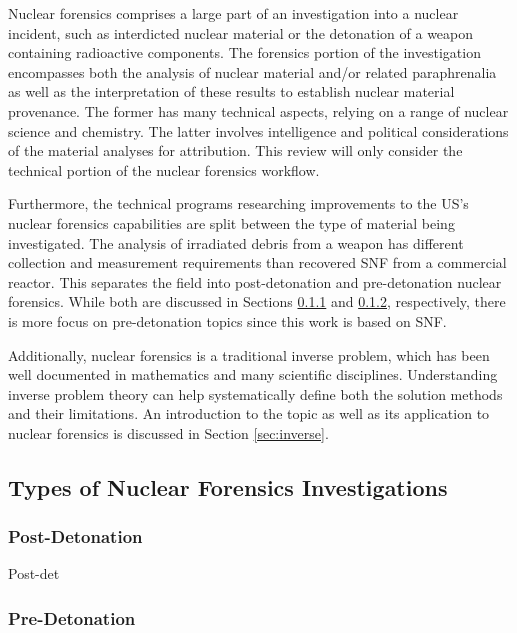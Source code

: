 Nuclear forensics comprises a large part of an investigation into a nuclear
incident, such as interdicted nuclear material or the detonation of a weapon
containing radioactive components.  The forensics portion of the investigation
encompasses both the analysis of nuclear material and/or related paraphrenalia
as well as the interpretation of these results to establish nuclear material
provenance. The former has many technical aspects, relying on a range of
nuclear science and chemistry.  The latter involves intelligence and political
considerations of the material analyses for attribution. This review will only
consider the technical portion of the nuclear forensics workflow.

Furthermore, the technical programs researching improvements to the \gls{US}'s
nuclear forensics capabilities are split between the type of material being
investigated. The analysis of irradiated debris from a weapon has different
collection and measurement requirements than recovered \gls{SNF} from a
commercial reactor. This separates the field into post-detonation and
pre-detonation nuclear forensics. While both are discussed in Sections
\ref{sec:postdet} and \ref{sec:predet}, respectively, there is more focus on
pre-detonation topics since this work is based on \gls{SNF}.

Additionally, nuclear forensics is a traditional inverse problem, which has
been well documented in mathematics and many scientific disciplines.
Understanding inverse problem theory can help systematically define both the
solution methods and their limitations. An introduction to the topic as well as
its application to nuclear forensics is discussed in Section \ref{sec:inverse}.

\subsection{Types of Nuclear Forensics Investigations}
\label{sec:types}

\subsubsection{Post-Detonation}
\label{sec:postdet}

Post-det

\subsubsection{Pre-Detonation}
\label{sec:predet}

